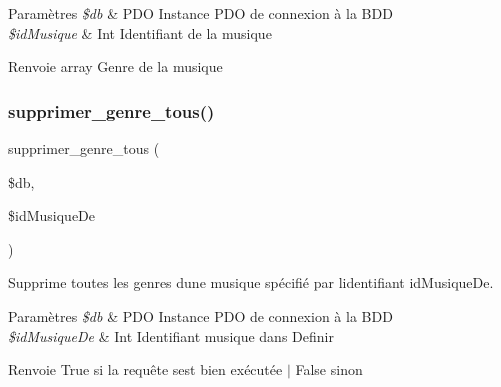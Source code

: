 \begin{DoxyParams}{Paramètres}
{\em \$db} & P\+DO Instance P\+DO de connexion à la B\+DD \\
\hline
{\em \$id\+Musique} & Int Identifiant de la musique \\
\hline
\end{DoxyParams}
\begin{DoxyReturn}{Renvoie}
array Genre de la musique 
\end{DoxyReturn}
\mbox{\label{fonctionGenre_8php_aac30608e1fb36a083cc805b80a8f1fa0}} 
\subsubsection{\texorpdfstring{supprimer\+\_\+genre\+\_\+tous()}{supprimer\_genre\_tous()}}
{\footnotesize\ttfamily supprimer\+\_\+genre\+\_\+tous (\begin{DoxyParamCaption}\item[{}]{\$db,  }\item[{}]{\$id\+Musique\+De }\end{DoxyParamCaption})}



Supprime toutes les genres d\textquotesingle{}une musique spécifié par l\textquotesingle{}identifiant \textquotesingle{}id\+Musique\+De\textquotesingle{}. 


\begin{DoxyParams}{Paramètres}
{\em \$db} & P\+DO Instance P\+DO de connexion à la B\+DD \\
\hline
{\em \$id\+Musique\+De} & Int Identifiant musique dans Definir \\
\hline
\end{DoxyParams}
\begin{DoxyReturn}{Renvoie}
True si la requête s\textquotesingle{}est bien exécutée $\vert$ False sinon 
\end{DoxyReturn}
